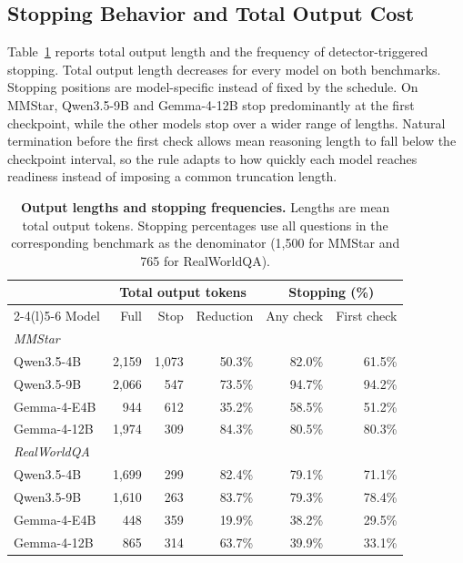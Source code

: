 \documentclass{article} %
\begin{document}
\subsection{Stopping Behavior and Total Output Cost}
\label{app:stopping_behavior}

Table~\ref{tab:output_stopping_stats} reports total output length and the frequency of detector-triggered stopping. Total output length decreases for every model on both benchmarks. Stopping positions are model-specific instead of fixed by the schedule. On MMStar, Qwen3.5-9B and Gemma-4-12B stop predominantly at the first checkpoint, while the other models stop over a wider range of lengths. Natural termination before the first check allows mean reasoning length to fall below the checkpoint interval, so the rule adapts to how quickly each model reaches readiness instead of imposing a common truncation length.

\begin{table}[H]
\centering\small
\renewcommand{\arraystretch}{1.05}
\setlength{\tabcolsep}{4pt}
\caption{\textbf{Output lengths and stopping frequencies.} Lengths are mean total output tokens. Stopping percentages use all questions in the corresponding benchmark as the denominator (1,500 for MMStar and 765 for RealWorldQA).}
\label{tab:output_stopping_stats}
\begin{tabular*}{\textwidth}{@{\extracolsep{\fill}}lrrrrr@{}}
\toprule
& \multicolumn{3}{c}{Total output tokens} & \multicolumn{2}{c}{Stopping (\%)} \\
\cmidrule(lr){2-4}\cmidrule(l){5-6}
Model & Full & Stop & Reduction & Any check & First check \\
\midrule
\multicolumn{6}{l}{\textit{MMStar}} \\
Qwen3.5-4B & 2,159 & 1,073 & 50.3\% & 82.0\% & 61.5\% \\
Qwen3.5-9B & 2,066 & 547 & 73.5\% & 94.7\% & 94.2\% \\
Gemma-4-E4B & 944 & 612 & 35.2\% & 58.5\% & 51.2\% \\
Gemma-4-12B & 1,974 & 309 & 84.3\% & 80.5\% & 80.3\% \\
\midrule
\multicolumn{6}{l}{\textit{RealWorldQA}} \\
Qwen3.5-4B & 1,699 & 299 & 82.4\% & 79.1\% & 71.1\% \\
Qwen3.5-9B & 1,610 & 263 & 83.7\% & 79.3\% & 78.4\% \\
Gemma-4-E4B & 448 & 359 & 19.9\% & 38.2\% & 29.5\% \\
Gemma-4-12B & 865 & 314 & 63.7\% & 39.9\% & 33.1\% \\
\bottomrule
\end{tabular*}
\end{table}
\end{document}
